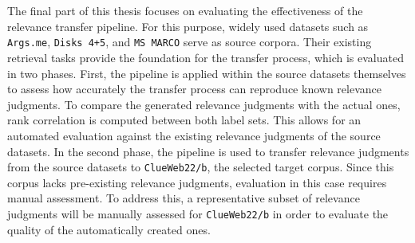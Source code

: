 \\\\
The final part of this thesis focuses on evaluating the effectiveness of the relevance transfer pipeline. For this purpose, widely used datasets such as \texttt{Args.me}, \texttt{Disks 4+5}, and \texttt{MS MARCO} serve as source corpora. Their existing retrieval tasks provide the foundation for the transfer process, which is evaluated in two phases. First, the pipeline is applied within the source datasets themselves to assess how accurately the transfer process can reproduce known relevance judgments. To compare the generated relevance judgments with the actual ones, rank correlation is computed between both label sets. This allows for an automated evaluation against the existing relevance judgments of the source datasets. In the second phase, the pipeline is used to transfer relevance judgments from the source datasets to \texttt{ClueWeb22/b}, the selected target corpus. Since this corpus lacks pre-existing relevance judgments, evaluation in this case requires manual assessment. To address this, a representative subset of relevance judgments will be manually assessed for \texttt{ClueWeb22/b} in order to evaluate the quality of the automatically created ones.
